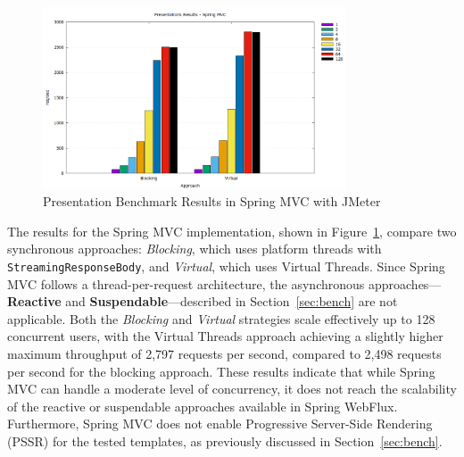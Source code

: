 \begin{figure}[h]
     \centering
     \includegraphics[width=0.8\textwidth]{./Graphs/presentations-springmvc-jmeter.png}
     \caption{Presentation Benchmark Results in Spring MVC with JMeter}\label{fig:presentations-springmvc-jmeter}
\end{figure}

The results for the Spring MVC implementation, shown in
Figure~\ref{fig:presentations-springmvc-jmeter}, compare two synchronous
approaches: \textit{Blocking}, which uses platform threads with
\texttt{StreamingResponseBody}, and \textit{Virtual}, which uses Virtual
Threads. Since Spring MVC follows a thread-per-request architecture, the
asynchronous approaches—\textbf{Reactive} and \textbf{Suspendable}—described in
Section~\ref{sec:bench} are not applicable. Both the \textit{Blocking} and
\textit{Virtual} strategies scale effectively up to 128 concurrent users, with
the Virtual Threads approach achieving a slightly higher maximum throughput of
2,797 requests per second, compared to 2,498 requests per second for the
blocking approach. These results indicate that while Spring MVC can handle a
moderate level of concurrency, it does not reach the scalability of the
reactive or suspendable approaches available in Spring WebFlux. Furthermore,
Spring MVC does not enable Progressive Server-Side Rendering (PSSR) for the
tested templates, as previously discussed in Section~\ref{sec:bench}.

